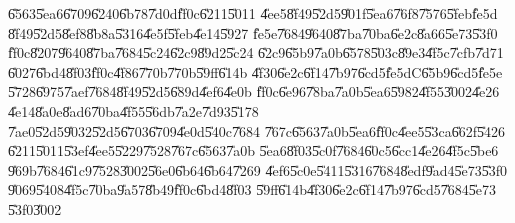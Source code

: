 \U{6563}\U{5ea6}\U{6709}\U{6240}\U{6b78}\U{7d0d}\U{ff0c}\U{6211}\U{5011}%
\U{4ee5}\U{8f49}\U{52d5}\U{901f}\U{5ea6}\U{76f8}\U{7576}\U{5feb}\U{fe5d}%
\U{8f49}\U{52d5}\U{8ef8}\U{8b8a}\U{5316}\U{4e5f}\U{5feb}\U{4e14}\U{5927}%
\U{fe5e}\U{7684}\U{9640}\U{87ba}\U{70ba}\U{6e2c}\U{8a66}\U{5e73}\U{53f0}%
\U{ff0c}\U{8207}\U{9640}\U{87ba}\U{7684}\U{5c24}\U{62c9}\U{89d2}\U{5c24}%
\U{62c9}\U{65b9}\U{7a0b}\U{6578}\U{503c}\U{89e3}\U{4f5c}\U{7cfb}\U{7d71}%
\U{6027}\U{6bd4}\U{8f03}\U{ff0c}\U{4f86}\U{770b}\U{770b}\U{59ff}\U{614b}%
\U{4f30}\U{6e2c}\U{6f14}\U{7b97}\U{6cd5}\U{fe5d}C\U{65b9}\U{6cd5}\U{fe5e}%
\U{5728}\U{6975}\U{7aef}\U{7684}\U{8f49}\U{52d5}\U{689d}\U{4ef6}\U{4e0b}%
\U{ff0c}\U{6e96}\U{78ba}\U{7a0b}\U{5ea6}\U{5982}\U{4f55}\U{3002}\U{4e26}%
\U{4e14}\U{8a0e}\U{8ad6}\U{70ba}\U{4f55}\U{56db}\U{7a2e}\U{7d93}\U{5178}%
\U{7ae0}\U{52d5}\U{9032}\U{52d5}\U{6703}\U{6709}\U{4e0d}\U{540c}\U{7684}%
\U{767c}\U{6563}\U{7a0b}\U{5ea6}\U{ff0c}\U{4ee5}\U{53ca}\U{662f}\U{5426}%
\U{6211}\U{5011}\U{53ef}\U{4ee5}\U{5229}\U{7528}\U{767c}\U{6563}\U{7a0b}%
\U{5ea6}\U{8f03}\U{5c0f}\U{7684}\U{60c5}\U{6cc1}\U{4e26}\U{4f5c}\U{5be6}%
\U{969b}\U{7684}\U{61c9}\U{7528}\U{3002}\U{56e0}\U{6b64}\U{6b64}\U{7269}%
\U{4ef6}\U{5c0e}\U{5411}\U{5316}\U{7684}\U{8edf}\U{9ad4}\U{5e73}\U{53f0}%
\U{9069}\U{5408}\U{4f5c}\U{70ba}\U{9a57}\U{8b49}\U{ff0c}\U{6bd4}\U{8f03}%
\U{59ff}\U{614b}\U{4f30}\U{6e2c}\U{6f14}\U{7b97}\U{6cd5}\U{7684}\U{5e73}%
\U{53f0}\U{3002}

\bigskip

